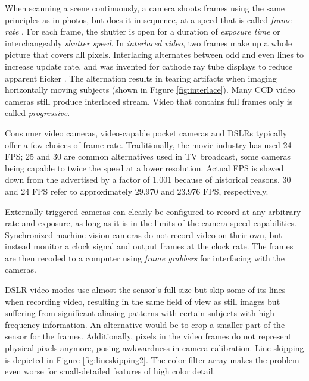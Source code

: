 When scanning a scene continuously, a camera shoots frames using the same principles as in photos, but does it in sequence, at a speed that is called \emph{frame rate} \cite{poynton1996technical}.
For each frame, the shutter is open for a duration of \emph{exposure time} or interchangeably \emph{shutter speed}.
In \emph{interlaced video}, two frames make up a whole picture that covers all pixels.
Interlacing alternates between odd and even lines to increase update rate, and was invented for cathode ray tube displays to reduce apparent flicker \cite{poynton1996technical}.
The alternation results in tearing artifacts when imaging horizontally moving subjects (shown in Figure \ref{fig:interlace}).
Many CCD video cameras still produce interlaced stream.
Video that contains full frames only is called \emph{progressive}.



Consumer video cameras, video-capable pocket cameras and DSLRs typically offer a few choices of frame rate.
Traditionally, the movie industry has used 24 FPS; 25 and 30 are common alternatives used in TV broadcast, some cameras being capable to twice the speed at a lower resolution.
Actual FPS is slowed down from the advertised by a factor of 1.001 because of historical reasons.
30 and 24 FPS refer to approximately 29.970 and 23.976 FPS, respectively.
\cite{musburger2010single}

Externally triggered cameras can clearly be configured to record at any arbitrary rate and exposure, as long as it is in the limits of the camera speed capabilities.
Synchronized machine vision cameras do not record video on their own, but instead monitor a clock signal and output frames at the clock rate.
The frames are then recoded to a computer using \emph{frame grabbers} for interfacing with the cameras.
\cite{hornberg2007handbook}


DSLR video modes use almost the sensor's full size but skip some of its lines when recording video, resulting in the same field of view as still images but suffering from significant aliasing patterns with certain subjects with high frequency information.
An alternative would be to crop a smaller part of the sensor for the frames.
Additionally, pixels in the video frames do not represent physical pixels anymore, posing awkwardness in camera calibration.
Line skipping is depicted in Figure \ref{fig:lineskipping2}.
The color filter array makes the problem even worse for small-detailed features of high color detail.

